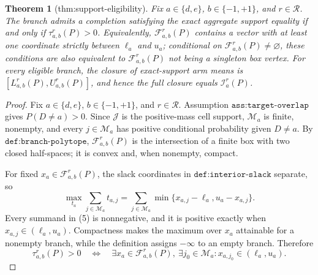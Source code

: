 \documentclass{article}
\newtheorem{theorem}{Theorem}
\begin{document}
\begin{theorem}[thm:support-eligibility]\label{thm:support-eligibility}
Fix \(a\in\{d,e\}\), \(b\in\{-1,+1\}\), and \(r\in\mathcal R\). The branch admits a completion satisfying the exact aggregate support equality if and only if \(\tau_{a,b}^r(P)>0\). Equivalently, \(\mathcal F_{a,b}^r(P)\) contains a vector with at least one coordinate strictly between \(\ell_a\) and \(u_a\); conditional on \(\mathcal F_{a,b}^r(P)\ne\varnothing\), these conditions are also equivalent to \(\mathcal F_{a,b}^r(P)\) not being a singleton box vertex. For every eligible branch, the closure of exact-support arm means is \([L_{a,b}^r(P),U_{a,b}^r(P)]\), and hence the full closure equals \(\mathcal I_a^r(P)\).
\end{theorem}
\begin{proof}
Fix \(a\in\{d,e\}\), \(b\in\{-1,+1\}\), and \(r\in\mathcal R\).  Assumption \(\texttt{ass:target-overlap}\) gives \(P(D\ne a)>0\).  Since \(\mathcal J\) is the positive-mass cell support, \(\mathcal M_a\) is finite, nonempty, and every \(j\in\mathcal M_a\) has positive conditional probability given \(D\ne a\).  By \(\texttt{def:branch-polytope}\), \(\mathcal F_{a,b}^r(P)\) is the intersection of a finite box with two closed half-spaces; it is convex and, when nonempty, compact.

For fixed \(x_a\in\mathcal F_{a,b}^r(P)\), the slack coordinates in \(\texttt{def:interior-slack}\) separate, so
\[
 \max_{t_a}\sum_{j\in\mathcal M_a}t_{a,j}
 =\sum_{j\in\mathcal M_a}
   \min\{x_{a,j}-\ell_a,u_a-x_{a,j}\}.                                      \tag{5}
\]
Every summand in (5) is nonnegative, and it is positive exactly when \(x_{a,j}\in(\ell_a,u_a)\).  Compactness makes the maximum over \(x_a\) attainable for a nonempty branch, while the definition assigns \(-\infty\) to an empty branch.  Therefore
\[
 \tau_{a,b}^r(P)>0
 \quad\Longleftrightarrow\quad
 \exists x_a\in\mathcal F_{a,b}^r(P),\ \exists j_0\in\mathcal M_a:
 x_{a,j_0}\in(\ell_a,u_a).                                                    \tag{6}
\]


\end{proof}
\end{document}
